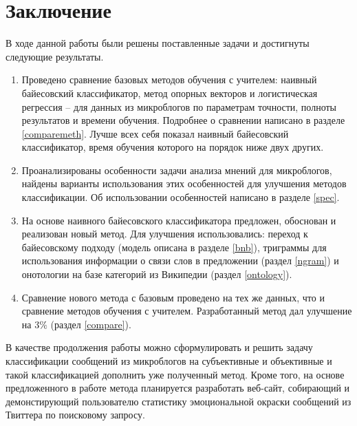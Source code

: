 \section*{Заключение}
В ходе данной работы были решены поставленные задачи и достигнуты следующие результаты.
\begin{enumerate}
\item Проведено сравнение базовых методов обучения с учителем: наивный байесовский классификатор,
  метод опорных векторов и логистическая регрессия --  для данных из микроблогов по
  параметрам точности, полноты результатов и времени обучения. Подробнее о сравнении написано в
  разделе \ref{comparemeth}. Лучше всех себя показал наивный байесовский классификатор, время
  обучения которого на порядок ниже двух других.
\item Проанализированы особенности задачи анализа мнений для микроблогов, найдены варианты
  использования этих особенностей для улучшения методов классификации. Об использовании особенностей
  написано в разделе \ref{spec}.
\item На основе наивного байесовского классификатора предложен, обоснован и реализован новый
  метод. Для улучшения использовались: переход к байесовскому подходу (модель описана в разделе
  \ref{bnb}), триграммы для использования информации о связи слов в предложении (раздел \ref{ngram})
  и онотологии на базе категорий из Википедии (раздел \ref{ontology}).
\item Сравнение нового метода с базовым проведено на тех же данных, что и сравнение методов обучения
  с учителем. Разработанный метод дал улучшение на $3\%$ (раздел \ref{compare}).
\end{enumerate}

В качестве продолжения работы можно сформулировать и решить задачу классификации сообщений
из микроблогов на субъективные и объективные и такой классификацией дополнить уже
полученный метод. Кроме того, на основе предложенного в работе метода планируется
разработать веб-сайт, собирающий и демонстирующий пользователю статистику эмоциональной окраски сообщений из Твиттера
по поисковому запросу.